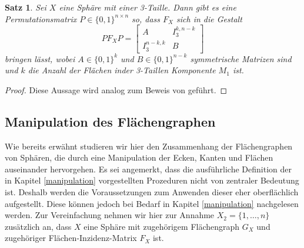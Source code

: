 \documentclass[12pt,titlepage,twoside,cleardoublepage]{article}
\theoremstyle{nummermitklammern}
\newtheorem{satz}[temp]{Satz}
\newtheorem{satz}[zahl]{Satz}
\numberwithin{equation}{section}
\begin{document}
\begin{satz}
Sei $X$ eine Sphäre mit einer 3-Taille. Dann gibt es eine Permutationsmatrix $P\in \{0,1\}^{n \times n}$ so, dass $F_X$ sich in die Gestalt 
\[
PF_XP=
\left[ 
\begin{array}{c|c} 
  A & I^{k,n-k}_3 \\ 
  \hline 
  I^{n-k,k}_3 & B 
\end{array} 
\right]
\] 
bringen lässt, wobei $A\in \{0,1\}^{k}$ und $B\in \{0,1\}^{n-k}$ symmetrische Matrizen sind und $k$ die Anzahl der Flächen inder 3-Taillen Komponente $M_1$ ist.
\end{satz}
\begin{proof}
Diese Aussage wird analog zum Beweis von  geführt.
\end{proof}

\subsection{Manipulation des Flächengraphen }
Wie bereits erwähnt studieren wir hier den Zusammenhang der Flächengraphen von Sphären, die durch eine Manipulation der Ecken, Kanten und Flächen auseinander hervorgehen. Es sei angemerkt, dass die ausführliche Definition der in Kapitel \ref{manipulation} vorgestellten Prozeduren nicht von zentraler Bedeutung ist. Deshalb werden die Voraussetzungen zum Anwenden dieser eher oberflächlich aufgestellt. Diese können jedoch bei Bedarf in Kapitel \ref{manipulation} nachgelesen werden. Zur Vereinfachung nehmen wir hier zur Annahme $X_2  =\{1,\ldots,n\}$ zusätzlich an, dass $X$ eine Sphäre mit zugehörigem Flächengraph $G_X$ und zugehöriger Flächen-Inzidenz-Matrix $F_X$ ist.
\end{document}
